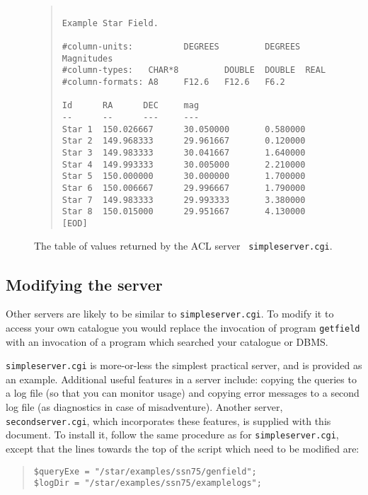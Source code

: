 \documentclass[twoside,11pt]{article}
\renewcommand{\_}{\texttt{\symbol{95}}}
\begin{document}
\begin{figure}[htbp]

\begin{quote}
\begin{verbatim}

Example Star Field. 

#column-units:          DEGREES         DEGREES         Magnitudes 
#column-types:   CHAR*8         DOUBLE  DOUBLE  REAL 
#column-formats: A8     F12.6   F12.6   F6.2 

Id      RA      DEC     mag 
--      --      ---     ---
Star 1  150.026667      30.050000       0.580000 
Star 2  149.968333      29.961667       0.120000 
Star 3  149.983333      30.041667       1.640000 
Star 4  149.993333      30.005000       2.210000 
Star 5  150.000000      30.000000       1.700000 
Star 6  150.006667      29.996667       1.790000 
Star 7  149.983333      29.993333       3.380000 
Star 8  150.015000      29.951667       4.130000 
[EOD]
\end{verbatim}

\caption{The table of values returned by the ACL server {\tt
simpleserver.cgi}.
\label{SIMPLE_TST} }
\end{quote}

\end{figure}


\subsection{Modifying the server}

Other servers are likely to be similar to {\tt simpleserver.cgi}.  To
modify it to access your own catalogue you would replace the invocation
of program {\tt getfield} with an invocation of a program which searched
your catalogue or DBMS.

{\tt simpleserver.cgi} is more-or-less the simplest practical server,
and is provided as an example.  Additional useful features in a server
include: copying the queries to a log file (so that you can monitor
usage) and copying error messages to a second log file (as diagnostics
in case of misadventure).  Another server, {\tt secondserver.cgi}, which
incorporates these features, is supplied with this document.  To install
it, follow the same procedure as for {\tt simpleserver.cgi}, except that
the lines towards the top of the script which need to be modified are:

  \begin{quote}
    \verb+$queryExe = "/star/examples/ssn75/genfield";+ \\
    \verb+$logDir = "/star/examples/ssn75/examplelogs";+
  \end{quote}
\end{document}
